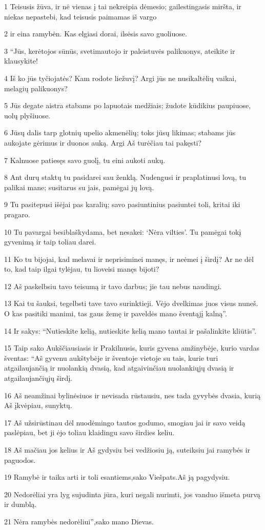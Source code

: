 \par 1 Teisusis žūva, ir nė vienas į tai nekreipia dėmesio; gailestingasis miršta, ir niekas nepastebi, kad teisusis paimamas iš vargo 
\par 2 ir eina ramybėn. Kas elgiasi dorai, ilsėsis savo guoliuose. 
\par 3 “Jūs, kerėtojos sūnūs, svetimautojo ir paleistuvės palikuonys, ateikite ir klausykite! 
\par 4 Iš ko jūs tyčiojatės? Kam rodote liežuvį? Argi jūs ne nusikaltėlių vaikai, melagių palikuonys? 
\par 5 Jūs degate aistra stabams po lapuotais medžiais; žudote kūdikius paupiuose, uolų plyšiuose. 
\par 6 Jūsų dalis tarp glotnių upelio akmenėlių; toks jūsų likimas; stabams jūs aukojate gėrimus ir duonos auką. Argi Aš turėčiau tai pakęsti? 
\par 7 Kalnuose patiesęs savo guolį, tu eini aukoti aukų. 
\par 8 Ant durų staktų tu pasidarei sau ženklą. Nudengusi ir praplatinusi lovą, tu palikai mane; susitarus su jais, pamėgai jų lovą. 
\par 9 Tu pasitepusi išėjai pas karalių; savo pasiuntinius pasiuntei toli, kritai iki pragaro. 
\par 10 Tu pavargai besiblaškydama, bet nesakei: ‘Nėra vilties’. Tu pamėgai tokį gyvenimą ir taip toliau darei. 
\par 11 Ko tu bijojai, kad melavai ir neprisiminei manęs, ir neėmei į širdį? Ar ne dėl to, kad taip ilgai tylėjau, tu lioveisi manęs bijoti? 
\par 12 Aš paskelbsiu tavo teisumą ir tavo darbus; jie tau nebus naudingi. 
\par 13 Kai tu šauksi, tegelbsti tave tavo surinktieji. Vėjo dvelkimas juos visus nuneš. O kas pasitiki manimi, tas gaus žemę ir paveldės mano šventąjį kalną”. 
\par 14 Ir sakys: “Nutieskite kelią, nutieskite kelią mano tautai ir pašalinkite kliūtis”. 
\par 15 Taip sako Aukščiausiasis ir Prakilnusis, kuris gyvena amžinybėje, kurio vardas šventas: “Aš gyvenu aukštybėje ir šventoje vietoje su tais, kurie turi atgailaujančią ir nuolankią dvasią, kad atgaivinčiau nuolankiųjų dvasią ir atgailaujančiųjų širdį. 
\par 16 Aš neamžinai bylinėsiuos ir nevisada rūstausiu, nes tada gyvybės dvasia, kurią Aš įkvėpiau, sunyktų. 
\par 17 Aš užsirūstinau dėl nuodėmingo tautos godumo, smogiau jai ir savo veidą paslėpiau, bet ji ėjo toliau klaidingu savo širdies keliu. 
\par 18 Aš mačiau jos kelius ir Aš gydysiu bei vedžiosiu ją, suteiksiu jai ramybės ir paguodos. 
\par 19 Ramybė ir taika arti ir toli esantiems,­sako Viešpats.­Aš ją pagydysiu. 
\par 20 Nedorėliai yra lyg sujudinta jūra, kuri negali nurimti, jos vanduo išmeta purvą ir dumblą. 
\par 21 Nėra ramybės nedorėliui”,­sako mano Dievas.



